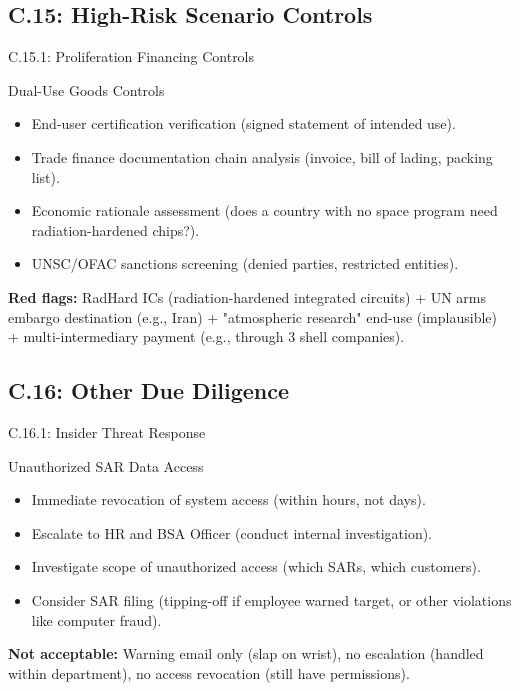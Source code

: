\documentclass{beamer}
\begin{document}
	\subsection{C.15: High-Risk Scenario Controls}
	
	\begin{frame}{C.15.1: Proliferation Financing Controls}
		\begin{block}{Dual-Use Goods Controls}
			\begin{itemize}
				\item End-user certification verification (signed statement of intended use).
				\item Trade finance documentation chain analysis (invoice, bill of lading, packing list).
				\item Economic rationale assessment (does a country with no space program need radiation-hardened chips?).
				\item UNSC/OFAC sanctions screening (denied parties, restricted entities).
			\end{itemize}
		\end{block}
		\textbf{Red flags:} RadHard ICs (radiation-hardened integrated circuits) + UN arms embargo destination (e.g., Iran) + "atmospheric research" end-use (implausible) + multi-intermediary payment (e.g., through 3 shell companies).
	\end{frame}
	
	\subsection{C.16: Other Due Diligence}
	
	\begin{frame}{C.16.1: Insider Threat Response}
		\begin{block}{Unauthorized SAR Data Access}
			\begin{itemize}
				\item Immediate revocation of system access (within hours, not days).
				\item Escalate to HR and BSA Officer (conduct internal investigation).
				\item Investigate scope of unauthorized access (which SARs, which customers).
				\item Consider SAR filing (tipping-off if employee warned target, or other violations like computer fraud).
			\end{itemize}
		\end{block}
		\textbf{Not acceptable:} Warning email only (slap on wrist), no escalation (handled within department), no access revocation (still have permissions).
	\end{frame}
	
\end{document}
